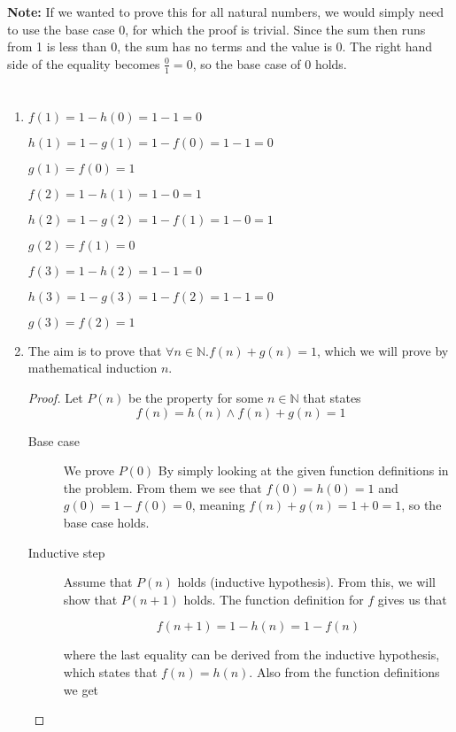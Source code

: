 \documentclass{article}
\begin{document}
\textbf{Note:} If we wanted to prove this for all natural numbers, we would simply need to use the base case 0, for which the proof is trivial. Since the sum then runs from 1 is less than 0, the sum has no terms and the value is 0. The right hand side of the equality becomes $\frac{0}{1} = 0$, so the base case of 0 holds.

\newpage
\section{}
\renewcommand{\labelenumi}{\alph{enumi})}
\begin{enumerate}
    \item 
        $f(1) = 1 - h(0) = 1 - 1 = 0$

        $h(1) = 1 - g(1) = 1 - f(0) = 1 - 1 = 0$

        $g(1) = f(0) = 1$

        $f(2) = 1 - h(1) = 1 - 0 = 1$

        $h(2) = 1 - g(2) = 1 - f(1) = 1 - 0 = 1$

        $g(2) = f(1) = 0$

        $f(3) = 1 - h(2) = 1 - 1 = 0$

        $h(3) = 1 - g(3) = 1 - f(2) = 1 - 1 = 0$

        $g(3) = f(2) = 1$

    \item
        The aim is to prove that $\forall n \in \mathbb{N} . f(n) + g(n) = 1$, which we will prove by mathematical induction $n$.

        \begin{proof}
            Let $P(n)$ be the property for some $n \in \mathbb{N}$ that states 
            $$f(n) = h(n) \land f(n) + g(n) = 1$$

            \begin{description}
                \item[Base case] We prove $P(0)$ By simply looking at the given function definitions in the problem. From them we see that $f(0) = h(0) = 1$ and $g(0) = 1 - f(0) = 0$, meaning $f(n) + g(n) = 1 + 0 = 1$, so the base case holds.
                \item[Inductive step] Assume that $P(n)$ holds (inductive hypothesis).
                    From this, we will show that $P(n+1)$ holds. The function definition for $f$ gives us that

                    $$f(n+1) = 1 - h(n) = 1 - f(n)$$

                    where the last equality can be derived from the inductive hypothesis, which states that $f(n) = h(n)$. Also from the function definitions we get


\end{description}
\end{proof}
\end{enumerate}
\end{document}
